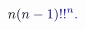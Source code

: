 \documentclass[12pt]{article}
\begin{document}
\makeatletter
\renewcommand*{\@textcolor}[3]{%
  \protect\leavevmode
  \begingroup
    \color#1{#2}#3%
  \endgroup
}
\makeatother
\begin{displaymath}
\mathcolor[RGB]{0,0,15}{n} \mathcolor[RGB]{0,0,30}{(} \mathcolor[RGB]{0,0,45}{n} \mathcolor[RGB]{0,0,60}{-} \mathcolor[RGB]{0,0,75}{1} \mathcolor[RGB]{0,0,90}{)} \mathcolor[RGB]{0,0,105}{!} \mathcolor[RGB]{0,0,120}{!} ^ { \mathcolor[RGB]{0,0,135}{n} } \mathcolor[RGB]{0,0,150}{.}
\end{displaymath}
\end{document}
